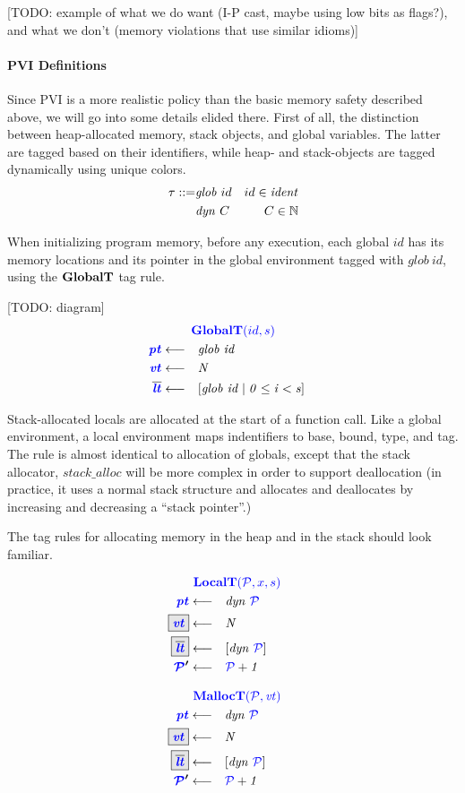 \documentclass[acmsmall,review,anonymous]{acmart}\settopmatter{printfolios=true,printccs=false,printacmref=false}
\begin{document}
[TODO: example of what we do want (I-P cast, maybe using low bits as flags?),
  and what we don't (memory violations that use similar idioms)]

\paragraph*{PVI Definitions}

Since PVI is a more realistic policy than the basic memory safety described above,
we will go into some details elided there. First of all, the distinction between
heap-allocated memory, stack objects, and global variables. The latter are tagged
based on their identifiers, while heap- and stack-objects are tagged dynamically
using unique colors.
%
\begin{align*}
  \tau ::= & \mathit{glob} ~ id & id \in \mathit{ident} \\
  & \mathit{dyn} ~ C & C \in \mathbb{N} \\
\end{align*}

When initializing program memory, before any execution, each global \(id\) has its
memory locations and its pointer in the global environment tagged with \(\mathit{glob} ~ id\),
using the \(\mathbf{GlobalT}\) tag rule.

[TODO: diagram]
\[\begin{aligned}
\truledef{\globalt}
\settag{\pt}{\mathit{glob ~ id}}
\settag{\vt}{N}
\settag{\overline{\lt}}{\left[\mathit{glob} ~ id \mid 0 \leq i < s\right]}
\end{aligned}\]

Stack-allocated locals are allocated at the start of a function call. Like a global environment,
a local environment maps indentifiers to base, bound, type, and tag. The rule is almost identical
to allocation of globals, except that the stack allocator, \(\mathit{stack\_alloc}\) will be more
complex in order to support deallocation (in practice, it uses a normal stack structure and allocates
and deallocates by increasing and decreasing a ``stack pointer''.)

The tag rules for allocating memory in the heap and in the stack should look familiar.

\begin{minipage}{0.49\textwidth}
\[\begin{aligned}
\truledef{\localt}
\settag{\pt}{dyn ~ \PCT}
\settagopt{\vt}{N}
\settagopt{\overline{\lt}}{\left[dyn ~ \PCT\right]}
\settag{\PCT'}{\PCT+1}
\end{aligned}\]
\end{minipage}
\begin{minipage}{0.49\textwidth}
\[\begin{aligned}
\truledef{\malloct}
\settag{\pt}{dyn ~ \PCT}
\settagopt{\vt}{N}
\settagopt{\overline{\lt}}{\left[dyn ~ \PCT\right]}
\settag{\PCT'}{\PCT + 1}
\end{aligned}\]
\end{minipage}
\end{document}
